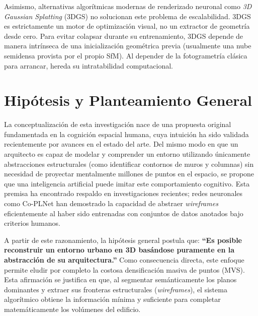 Asimismo, alternativas algorítmicas modernas de renderizado neuronal como \textit{3D Gaussian Splatting} (3DGS) \cite{kerbl20233d} no solucionan este problema de escalabilidad. 3DGS es estrictamente un motor de optimización visual, no un extractor de geometría desde cero. Para evitar colapsar durante su entrenamiento, 3DGS depende de manera intrínseca de una inicialización geométrica previa (usualmente una nube semidensa provista por el propio SfM). Al depender de la fotogrametría clásica para arrancar, hereda su intratabilidad computacional.

\section{Hipótesis y Planteamiento General}

La conceptualización de esta investigación nace de una propuesta original fundamentada en la cognición espacial humana, cuya intuición ha sido validada recientemente por avances en el estado del arte. Del mismo modo en que un arquitecto es capaz de modelar y comprender un entorno utilizando únicamente abstracciones estructurales (como identificar contornos de muros y columnas) sin necesidad de proyectar mentalmente millones de puntos en el espacio, se propone que una inteligencia artificial puede imitar este comportamiento cognitivo. Esta premisa ha encontrado respaldo en investigaciones recientes; redes neuronales como Co-PLNet han demostrado la capacidad de abstraer \textit{wireframes} eficientemente al haber sido entrenadas con conjuntos de datos anotados bajo criterios humanos.

A partir de este razonamiento, la hipótesis general postula que: \textbf{``Es posible reconstruir un entorno urbano en 3D basándose puramente en la abstracción de su arquitectura.''} Como consecuencia directa, este enfoque permite eludir por completo la costosa densificación masiva de puntos (MVS). Esta afirmación se justifica en que, al segmentar semánticamente los planos dominantes y extraer sus fronteras estructurales (\textit{wireframes}), el sistema algorítmico obtiene la información mínima y suficiente para completar matemáticamente los volúmenes del edificio.


